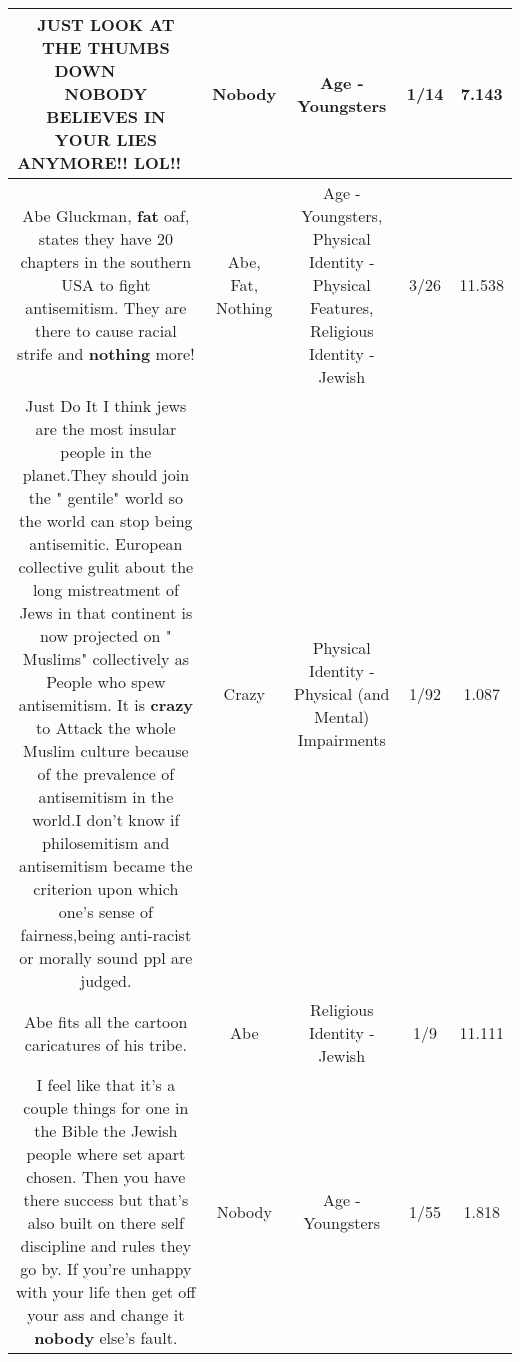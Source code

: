 \documentclass[11pt]{article}
\newlength\mylength
\begin{document}
\begin{center}
\begin{longtable}{|C{.65\mylength}|C{.30\mylength}|C{.12\mylength}|C{.12\mylength}|C{.12\mylength}|}
  \small JUST LOOK AT THE THUMBS DOWN 👎🏻👎🏻👎🏻👎🏻 \textbf{NOBODY} BELIEVES IN YOUR LIES ANYMORE!! LOL!!🤣😁🤪\normalsize   & Nobody & Age - Youngsters & 1/14 & 7.143 \\  \hline
  \small Abe Gluckman, \textbf{fat} oaf, states they have 20 chapters in the southern USA to fight antisemitism.  They are there to cause racial strife and \textbf{nothing} more!\normalsize   & Abe, Fat, Nothing & Age - Youngsters, Physical Identity - Physical Features, Religious Identity - Jewish & 3/26 & 11.538 \\  \hline
  \small Just Do It I think jews are the most insular people in the planet.They should join the " gentile" world so the world can stop being antisemitic. European collective gulit about the long mistreatment of Jews  in that continent is now projected on " Muslims" collectively as People who spew antisemitism. It is \textbf{crazy} to Attack the whole Muslim culture because of the prevalence of antisemitism in the world.I don't know if philosemitism and antisemitism became the criterion upon which one's sense of fairness,being anti-racist or morally sound ppl are judged.\normalsize   & Crazy & Physical Identity - Physical (and Mental) Impairments & 1/92 & 1.087 \\  \hline
  \small Abe fits all the cartoon caricatures of his tribe.\normalsize   & Abe & Religious Identity - Jewish & 1/9 & 11.111 \\  \hline
  \small I feel like that it's a couple things for one in the Bible the Jewish people where set apart chosen. Then you have there success but that's also built on there self discipline and rules they go by. If you're unhappy with your life then get off your ass and change it \textbf{nobody} else's fault.\normalsize   & Nobody & Age - Youngsters & 1/55 & 1.818 \\  \hline

\end{longtable}
\end{center}
\end{document}
